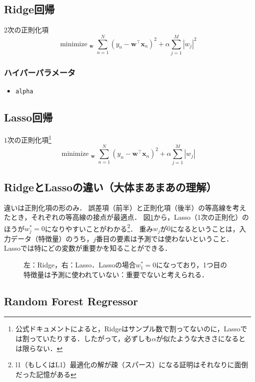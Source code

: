 \documentclass[a4paper,lualatex,ja=standard,oneside,fleqn]{bxjsarticle}
\DeclareMathOperator*{\minimize}{minimize\ }
\begin{document}
\subsection{Ridge回帰}
$2$次の正則化項
\begin{equation*}
  \minimize_{\bm{w}}\sum_{n=1}^N(y_n-\bm{w}^\top\bm{x}_n)^2 + \alpha \sum_{j=1}^M|w_j|^2
\end{equation*}
\subsubsection*{ハイパーパラメータ}
\begin{itemize}
  \item \verb|alpha|
\end{itemize}

\subsection{Lasso回帰}
$1$次の正則化項\footnote{公式ドキュメントによると，Ridgeはサンプル数で割ってないのに，Lassoでは割っていたりする．したがって，必ずしも$\alpha$が似たような大きさになるとは限らない．}
\begin{equation*}
  \minimize_{\bm{w}}\sum_{n=1}^N(y_n-\bm{w}^\top\bm{x}_n)^2 + \alpha \sum_{j=1}^M|w_j|
\end{equation*}


\subsection*{RidgeとLassoの違い（大体まあまあの理解）}
違いは正則化項の形のみ．
誤差項（前半）と正則化項（後半）の等高線を考えたとき，それぞれの等高線の接点が最適点．
図\ref{fig:ridge_lasso}から，Lasso（1次の正則化）のほうが$w^\ast_j=0$になりやすいことがわかる\footnote{l1（もしくはL1）最適化の解が疎（スパース）になる証明はそれなりに面倒だった記憶がある}．
重み$w_j$が$0$になるということは，入力データ（特徴量）のうち，$j$番目の要素は予測では使わないということ．
Lassoでは特にどの変数が重要かを知ることができる．

\begin{figure}[htbp]
  \centering
  
  \caption{左：Ridge，右：Lasso．Lassoの場合$w^\ast_1=0$になっており，1つ目の特徴量は予測に使われていない：重要でないと考えられる．}
  \label{fig:ridge_lasso}
\end{figure}

\subsection{Random Forest Regressor}
\end{document}
